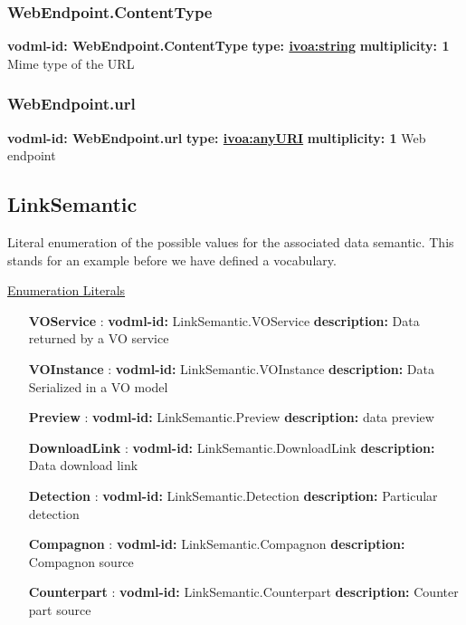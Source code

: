     \subsubsection{WebEndpoint.ContentType}
      \textbf{vodml-id: WebEndpoint.ContentType} \newline
      \textbf{type: \hyperref[sect:ivoa]{ivoa:string}} \newline
      \textbf{multiplicity: 1} \newline 
      Mime type of the URL

    \subsubsection{WebEndpoint.url}
      \textbf{vodml-id: WebEndpoint.url} \newline
      \textbf{type: \hyperref[sect:ivoa]{ivoa:anyURI}} \newline
      \textbf{multiplicity: 1} \newline 
      Web endpoint

  \subsection{LinkSemantic}
  \label{sect:LinkSemantic}

  Literal enumeration of the possible values for the associated data semantic. This stands for an example before we have defined a vocabulary.

  \noindent \underline{Enumeration Literals}
  \vspace{-\parsep}
  \small
  \begin{itemize}
  
    \item[\textbf{VOService}]: \textbf{vodml-id:} LinkSemantic.VOService \newline
          \textbf{description:} Data returned by a VO service
    \item[\textbf{VOInstance}]: \textbf{vodml-id:} LinkSemantic.VOInstance \newline
          \textbf{description:} Data Serialized in a VO model
    \item[\textbf{Preview}]: \textbf{vodml-id:} LinkSemantic.Preview \newline
          \textbf{description:} data preview
    \item[\textbf{DownloadLink}]: \textbf{vodml-id:} LinkSemantic.DownloadLink \newline
          \textbf{description:} Data download link
    \item[\textbf{Detection}]: \textbf{vodml-id:} LinkSemantic.Detection \newline
          \textbf{description:} Particular detection
    \item[\textbf{Compagnon}]: \textbf{vodml-id:} LinkSemantic.Compagnon \newline
          \textbf{description:} Compagnon source
    \item[\textbf{Counterpart}]: \textbf{vodml-id:} LinkSemantic.Counterpart \newline
          \textbf{description:} Counter part source
  \end{itemize}
  \normalsize


